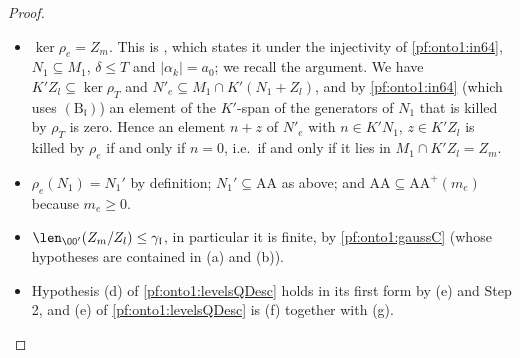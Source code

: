 \begin{proof}
\begin{itemize}
, which states that, under $(\mathrm C_{\mathfrak l})$,
$(\mathrm T_{\mathfrak l})$, $u_k\in W$, $\theta'_i\in\mathcal M_{w_F}$, $\delta\le T$ and $|\alpha_k|=a_0$, the map $\rho_T$ sends
$N'_e$ into $\mathrm{AA}^+(m_e)$. Its proof treats the three summands of $N'_e$: $\rho_T$ kills $K'Z_l$
(, which states exactly this, under $\delta\le T$
and $|\alpha_k|=a_0$; note that $s^{\alpha_k}/s_0^{a_0}\in J^{a_0}$ and $\mathrm{emb}\,\iota\theta^0_k/s_0^{\delta}\in H(w_F)$), it
maps $N_1$ into $\mathrm{AA}$ (\cref{pf:onto1:good}(c), which uses $(\mathrm C_{\mathfrak l})$, $(\mathrm T_{\mathfrak l})$, $u_k\in W$
and $\theta'_i\in\mathcal M_{w_F}$),
and it maps $\varpi^eM_1$ into $\mathrm{AA}^+(m_e)$
(, which states this under
$(\mathrm C_{\mathfrak l})$, $(\mathrm T_{\mathfrak l})$ and $u_k\in W$; its proof shows that $\rho_T(M_1)\subseteq\mathrm{AA}^+(m_0)$
and that multiplication by $\varpi^e$ maps $\mathrm{AA}^+(m_0)$ into $\mathrm{AA}^+(m_e)$).
\item $\ker\rho_e=Z_m$. This is , which states it
under the injectivity of \cref{pf:onto1:in64}, $N_1\subseteq M_1$, $\delta\le T$ and $|\alpha_k|=a_0$; we recall the
argument. We have $K'Z_l\subseteq\ker\rho_T$ and $N'_e\subseteq M_1\cap K'(N_1+Z_l)$, and by \cref{pf:onto1:in64} (which
uses $(\mathrm B_{\mathfrak l})$) an element of the $K'$-span of the generators of $N_1$ that is killed by $\rho_T$ is zero.
Hence an element $n+z$ of $N'_e$ with $n\in K'N_1$, $z\in K'Z_l$ is killed by $\rho_e$ if and only if $n=0$, i.e.\ if and
only if it lies in $M_1\cap K'Z_l=Z_m$.
\item $\rho_e(N_1)=N_1'$ by definition; $N_1'\subseteq\mathrm{AA}$ as above; and $\mathrm{AA}\subseteq\mathrm{AA}^+(m_e)$ because
$m_e\ge0$.
\item $\len_{\OO'}(Z_m/Z_l)\le\gamma_{\mathfrak l}$, in particular it is finite, by \cref{pf:onto1:gaussC} (whose hypotheses
are contained in (a) and (b)).
\item Hypothesis (d) of \cref{pf:onto1:levelsQDesc} holds in its first form by (e) and Step 2, and (e) of
\cref{pf:onto1:levelsQDesc} is (f) together with (g).
\end{itemize}


\end{proof}
